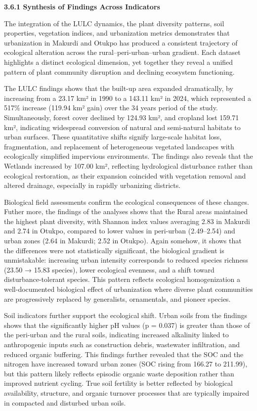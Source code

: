 {}\textbf{3.6.1 Synthesis of Findings Across Indicators}

The integration of the LULC dynamics, the plant diversity patterns, soil properties, vegetation indices, and urbanization metrics demonstrates that urbanization in Makurdi and Otukpo has produced a consistent trajectory of ecological alteration across the rural--peri-urban--urban gradient. Each dataset highlights a distinct ecological dimension, yet together they reveal a unified pattern of plant community disruption and declining ecosystem functioning.

The LULC findings shows that the built-up area expanded dramatically, by increasing from a 23.17 km² in 1990 to a 143.11 km² in 2024, which represented a 517\% increase (119.94 km² gain) over the 34 years period of the study. Simultaneously, forest cover declined by 124.93 km², and cropland lost 159.71 km², indicating widespread conversion of natural and semi-natural habitats to urban surfaces. These quantitative shifts signify large-scale habitat loss, fragmentation, and replacement of heterogeneous vegetated landscapes with ecologically simplified impervious environments. The findings also reveals that the Wetlands increased by 107.00 km², reflecting hydrological disturbance rather than ecological restoration, as their expansion coincided with vegetation removal and altered drainage, especially in rapidly urbanizing districts.

Biological field assessments confirm the ecological consequences of these changes. Futher more, the findings of the analyses shows that the Rural areas maintained the highest plant diversity, with Shannon index values averaging 2.83 in Makurdi and 2.74 in Otukpo, compared to lower values in peri-urban (2.49--2.54) and urban zones (2.64 in Makurdi; 2.52 in Otukpo). Again somehow, it shows that the differences were not statistically significant, the biological gradient is unmistakable: increasing urban intensity corresponds to reduced species richness (23.50 → 15.83 species), lower ecological evenness, and a shift toward disturbance-tolerant species. This pattern reflects ecological homogenization a well-documented biological effect of urbanization where diverse plant communities are progressively replaced by generalists, ornamentals, and pioneer species.

Soil indicators further support the ecological shift. Urban soils from the findings shows that the significantly higher pH values (p = 0.037) is greater than those of the peri-urban and the rural soils, indicating increased alkalinity linked to anthropogenic inputs such as construction debris, wastewater infiltration, and reduced organic buffering. This findings further revealed that the SOC and the nitrogen have increased toward urban zones (SOC rising from 166.27 to 211.99), but this pattern likely reflects episodic organic waste deposition rather than improved nutrient cycling. True soil fertility is better reflected by biological availability, structure, and organic turnover processes that are typically impaired in compacted and disturbed urban soils.

